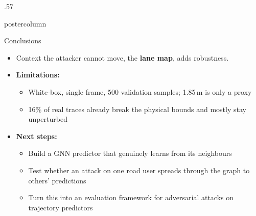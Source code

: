 \documentclass{beamer}
\begin{document}
\begin{frame}
\begin{columns}
\begin{column}{.57\textwidth}
\begin{beamercolorbox}[center]{postercolumn}
\begin{minipage}{.98\textwidth}
{\begin{myblock}{Conclusions}
\begin{itemize}
							\item Context the attacker cannot move, the \textbf{lane map}, adds robustness.
							\item \textbf{Limitations:}
							\begin{itemize}
								\item White-box, single frame, 500 validation samples; 1.85\,m is only a proxy
								\item 16\% of real traces already break the physical bounds and mostly stay unperturbed
							\end{itemize}
							\item \textbf{Next steps:}
							\begin{itemize}
								\item Build a GNN predictor that genuinely learns from its neighbours
								\item Test whether an attack on one road user spreads through the graph to others' predictions
								\item Turn this into an evaluation framework for adversarial attacks on trajectory predictors
							\end{itemize}
						\end{itemize}
					\end{myblock}\vfill
		}\end{minipage}\end{beamercolorbox}
	\end{column}
\end{columns}
\end{frame}
\end{document}
